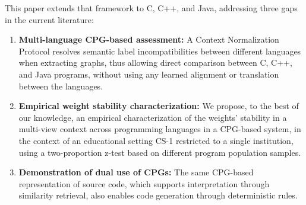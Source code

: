 This paper extends that framework to C, C++, and Java, addressing three gaps in the current literature:
\begin{enumerate}
    \item \textbf{Multi-language CPG-based assessment:} A Context Normalization Protocol resolves semantic label incompatibilities between different languages when extracting graphs, thus allowing direct comparison between C, C++, and Java programs, without using any learned alignment or translation between the languages.
    \item \textbf{Empirical weight stability characterization:} We propose, to the best of our knowledge, an empirical characterization of the weights' stability in a multi-view context across programming languages in a CPG-based system, in the context of an educational setting CS-1 restricted to a single institution, using a two-proportion z-test based on different program population samples.
    \item \textbf{Demonstration of dual use of CPGs:} The same CPG-based representation of source code, which supports interpretation through similarity retrieval, also enables code generation through deterministic rules.
\end{enumerate}


